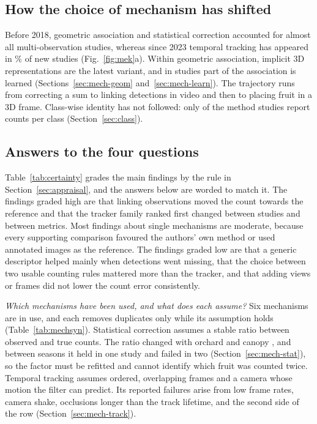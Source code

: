 \subsection{How the choice of mechanism has shifted}
Before 2018, geometric association and statistical correction accounted for almost all multi-observation studies, whereas since 2023 temporal tracking has appeared in \pTrackRecent\% of new studies (Fig.~\ref{fig:mek}a). Within geometric association, implicit 3D representations are the latest variant, and in \nLearn studies part of the association is learned (Sections~\ref{sec:mech-geom} and~\ref{sec:mech-learn}). The trajectory runs from correcting a sum to linking detections in video and then to placing fruit in a 3D frame. Class-wise identity has not followed: only \nPerClass of the \nMethod method studies report counts per class (Section~\ref{sec:class}).

\subsection{Answers to the four questions}
Table~\ref{tab:certainty} grades the main findings by the rule in Section~\ref{sec:appraisal}, and the answers below are worded to match it. The findings graded high are that linking observations moved the count towards the reference and that the tracker family ranked first changed between studies and between metrics. Most findings about single mechanisms are moderate, because every supporting comparison favoured the authors' own method or used annotated images as the reference. The findings graded low are that a generic descriptor helped mainly when detections went missing, that the choice between two usable counting rules mattered more than the tracker, and that adding views or frames did not lower the count error consistently.



\textit{Which mechanisms have been used, and what does each assume?} Six mechanisms are in use, and each removes duplicates only while its assumption holds (Table~\ref{tab:mechsyn}). Statistical correction assumes a stable ratio between observed and true counts. The ratio changed with orchard and canopy \citep{anderson2021estimation,islam2022ground}, and between seasons it held in one study and failed in two (Section~\ref{sec:mech-stat}), so the factor must be refitted and cannot identify which fruit was counted twice. Temporal tracking assumes ordered, overlapping frames and a camera whose motion the filter can predict. Its reported failures arise from low frame rates, camera shake, occlusions longer than the track lifetime, and the second side of the row (Section~\ref{sec:mech-track}).

